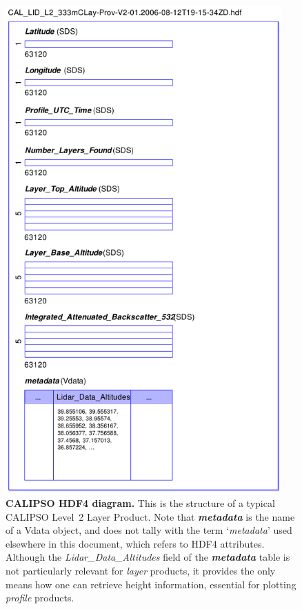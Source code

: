 \begin{figure}[p]
\includegraphics[width=300pt]{images/hdf4_calipso.pdf}
\caption[CALIPSO HDF4 diagram]{\textbf{CALIPSO HDF4 diagram.} This is the structure of a typical
CALIPSO Level~2 Layer Product. Note that
\textbf{\textit{metadata}} is the name of a Vdata object, and does not tally
with the term `\textit{metadata}' used elsewhere in this document, which refers to HDF4
attributes. Although the \textit{Lidar\_Data\_Altitudes} field of the
\textbf{\textit{metadata}} table is not particularly relevant for \textit{layer} products,
it provides the only means how one can retrieve height
information, essential for plotting \textit{profile} products.}
\label{fig:hdf4-calipso}
\end{figure}

